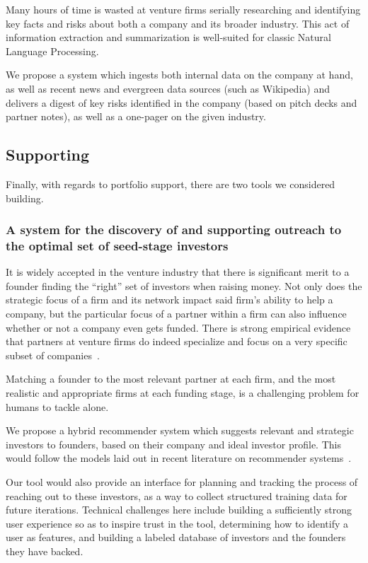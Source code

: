 Many hours of time is wasted at venture firms serially researching and identifying key facts and risks about both a company and its broader industry. This act of information extraction and summarization is well-suited for classic Natural Language Processing.

We propose a system which ingests both internal data on the company at hand, as well as recent news and evergreen data sources (such as Wikipedia) and delivers a digest of key risks identified in the company (based on pitch decks and partner notes), as well as a one-pager on the given industry.

\subsection{Supporting}

Finally, with regards to portfolio support, there are two tools we considered building.

\subsubsection{A system for the discovery of and supporting outreach to the optimal set of seed-stage investors}

It is widely accepted in the venture industry that there is significant merit to a founder finding the ``right'' set of investors when raising money. Not only does the strategic focus of a firm and its network impact said firm's ability to help a company, but the particular focus of a partner within a firm can also influence whether or not a company even gets funded. There is strong empirical evidence that partners at venture firms do indeed specialize and focus on a very specific subset of companies~\cite{Stone:2013:EST:2541167.2507882}.

Matching a founder to the most relevant partner at each firm, and the most realistic and appropriate firms at each funding stage, is a challenging problem for humans to tackle alone.

We propose a hybrid recommender system which suggests relevant and strategic investors to founders, based on their company and ideal investor profile. This would follow the models laid out in recent literature on recommender systems~\cite{Burke2002}.

Our tool would also provide an interface for planning and tracking the process of reaching out to these investors, as a way to collect structured training data for future iterations. Technical challenges here include building a sufficiently strong user experience so as to inspire trust in the tool, determining how to identify a user as features, and building a labeled database of investors and the founders they have backed.

